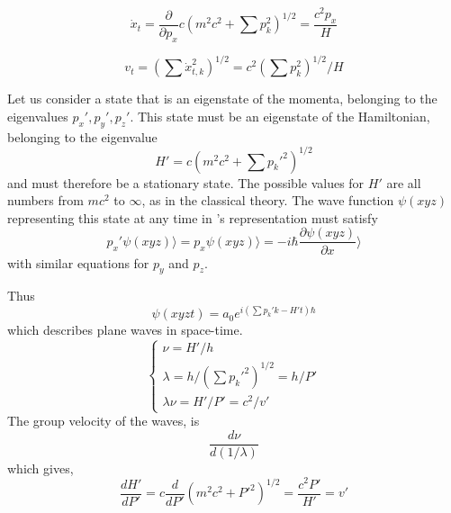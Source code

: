 \begin{equation}
\dot{x}_t = \frac{\partial}{\partial p_x} c(m^2c^2 + \sum p_k^2)^{1/2}=\frac{c^2 p_x}{H}
\end{equation}

\begin{equation}
v_t=(\sum \dot{x}_{t,k}^2)^{1/2} = c^2 (\sum p_k^2)^{1/2}/H
\end{equation}

Let us consider a state that is an eigenstate of the momenta, belonging to the eigenvalues $p_x',p_y',p_z'$. This state must be an eigenstate of the Hamiltonian, belonging to the eigenvalue
\begin{equation}
H' = c(m^2c^2 +\sum p_k'^2)^{1/2}
\end{equation}
and must therefore be a stationary state. The possible values for $H'$ are all numbers from $mc^2$ to $\infty$, as in the classical theory. The wave function $\psi(xyz)$ representing this state at any time in \sch's representation must satisfy 
\begin{equation}
p_x'\psi(xyz)\rangle = p_x \psi (xyz) \rangle = - i\hbar \frac{\partial \psi (xyz)}{\partial x} \rangle
\end{equation}
with similar equations for $p_y$ and $p_z$.

Thus
\begin{equation}
\psi(xyzt)= a_0 e^{i(\sum p_k'k -H't)\hbar}
\end{equation}
which describes plane waves in space-time.
\begin{equation}
\begin{cases}
\nu = H' / h \\
\lambda = h/(\sum p_k'^2)^{1/2} = h/P'\\
\lambda \nu = H' / P' = c^2/v'
\end{cases}
\end{equation}
The group velocity of the waves, is
\begin{equation}
\frac{d\nu}{d(1/\lambda)}
\end{equation}
which gives, 
\begin{equation}
\frac{dH'}{dP'} = c\frac{d}{dP'} (m^2c^2 + P'^2)^{1/2} = \frac{c^2P'}{H'} = v'
\end{equation}


